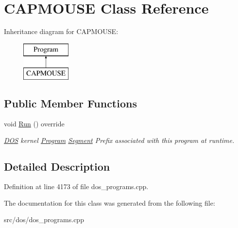 \hypertarget{classCAPMOUSE}{\section{C\-A\-P\-M\-O\-U\-S\-E Class Reference}
\label{classCAPMOUSE}
}
Inheritance diagram for C\-A\-P\-M\-O\-U\-S\-E\-:\begin{figure}[H]
\begin{center}
\leavevmode
\includegraphics[height=2.000000cm]{classCAPMOUSE}
\end{center}
\end{figure}
\subsection*{Public Member Functions}
\begin{DoxyCompactItemize}
\item 
\hypertarget{classCAPMOUSE_a40f8a87bf9027081766fb5e0fc74149a}{void \hyperlink{classCAPMOUSE_a40f8a87bf9027081766fb5e0fc74149a}{Run} () override}\label{classCAPMOUSE_a40f8a87bf9027081766fb5e0fc74149a}

\begin{DoxyCompactList}\small\item\em \hyperlink{classDOS}{D\-O\-S} kernel \hyperlink{classProgram}{Program} \hyperlink{structSegment}{Segment} Prefix associated with this program at runtime. \end{DoxyCompactList}\end{DoxyCompactItemize}


\subsection{Detailed Description}


Definition at line 4173 of file dos\-\_\-programs.\-cpp.



The documentation for this class was generated from the following file\-:\begin{DoxyCompactItemize}
\item 
src/dos/dos\-\_\-programs.\-cpp\end{DoxyCompactItemize}
